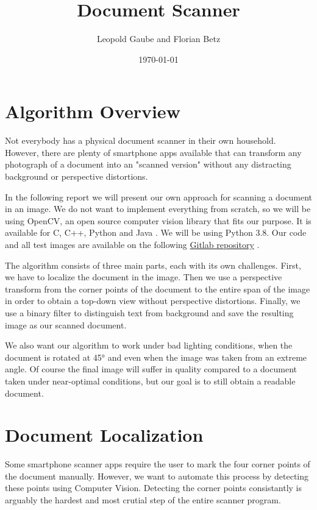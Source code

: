 \documentclass[bibliography=totoc]{scrartcl}
\title{Document Scanner}
\author{Leopold Gaube and Florian Betz}
\date{\today}
\begin{document}
	\maketitle
	\tableofcontents

	\clearpage	

    \section{Algorithm Overview}
	Not everybody has a physical document scanner in their own household. 
	However, there are plenty of smartphone apps available that can transform any photograph of a document into an "scanned version" without any distracting background or perspective distortions.
	
	In the following report we will present our own approach for scanning a document in an image.
	We do not want to implement everything from scratch, so we will be using \acs{OpenCV}, an open source computer vision library that fits our purpose.	
	It is available for C, C++, Python and Java \cite{OpenCV}.
	We will be using Python 3.8. Our code and all test images are available on the following \hyperlink{https://gitlab.com/gaubeleo/document-scanner}{Gitlab repository} \cite{Gitlab}.
	
	The algorithm consists of three main parts, each with its own challenges.
	First, we have to localize the document in the image. 
	Then we use a perspective transform from the corner points of the document to the entire span of the image in order to obtain a top-down view without perspective distortions.
	Finally, we use a binary filter to distinguish text from background and save the resulting image as our scanned document.

	We also want our algorithm to work under bad lighting conditions, when the document is rotated at 45° and even when the image was taken from an extreme angle.
	Of course the final image will suffer in quality compared to a document taken under near-optimal conditions, but our goal is to still obtain a readable document.
	
	\section{Document Localization}
	Some smartphone scanner apps require the user to mark the four corner points of the document manually. 
	However, we want to automate this process by detecting these points using Computer Vision.
	Detecting the corner points consistantly is arguably the hardest and most crutial step of the entire scanner program. 
	
\end{document}
